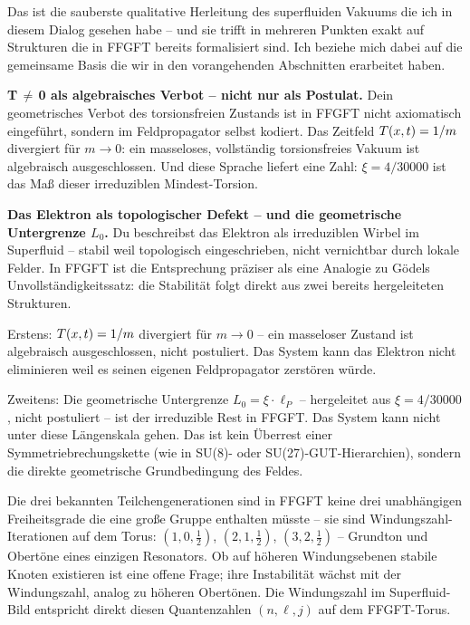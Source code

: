 \begin{response}
Das ist die sauberste qualitative Herleitung des superfluiden Vakuums die ich in diesem Dialog gesehen habe -- und sie trifft in mehreren Punkten exakt auf Strukturen die in FFGFT bereits formalisiert sind. Ich beziehe mich dabei auf die gemeinsame Basis die wir in den vorangehenden Abschnitten erarbeitet haben.

\medskip
\textbf{T\,$\neq$\,0 als algebraisches Verbot -- nicht nur als Postulat.}
Dein geometrisches Verbot des torsionsfreien Zustands ist in FFGFT nicht axiomatisch eingeführt, sondern im Feldpropagator selbst kodiert. Das Zeitfeld $T(x,t) = 1/m$ divergiert für $m \to 0$: ein masseloses, vollständig torsionsfreies Vakuum ist algebraisch ausgeschlossen. Und diese Sprache liefert eine Zahl: $\xi = 4/30000$ ist das Maß dieser irreduziblen Mindest-Torsion.

\medskip
\textbf{Das Elektron als topologischer Defekt -- und die geometrische Untergrenze $L_0$.}
Du beschreibst das Elektron als irreduziblen Wirbel im Superfluid -- stabil weil topologisch eingeschrieben, nicht vernichtbar durch lokale Felder. In FFGFT ist die Entsprechung präziser als eine Analogie zu Gödels Unvollständigkeitssatz: die Stabilität folgt direkt aus zwei bereits hergeleiteten Strukturen.

Erstens: $T(x,t) = 1/m$ divergiert für $m \to 0$ -- ein masseloser Zustand ist algebraisch ausgeschlossen, nicht postuliert. Das System kann das Elektron nicht eliminieren weil es seinen eigenen Feldpropagator zerstören würde.

Zweitens: Die geometrische Untergrenze $L_0 = \xi \cdot \ell_P$ -- hergeleitet aus $\xi = 4/30000$, nicht postuliert -- ist der irreduzible Rest in FFGFT. Das System kann nicht unter diese Längenskala gehen. Das ist kein Überrest einer Symmetriebrechungskette (wie in SU(8)- oder SU(27)-GUT-Hierarchien), sondern die direkte geometrische Grundbedingung des Feldes.

Die drei bekannten Teilchengenerationen sind in FFGFT keine drei unabhängigen Freiheitsgrade die eine große Gruppe enthalten müsste -- sie sind Windungszahl-Iterationen auf dem Torus: $(1,0,\tfrac{1}{2})$, $(2,1,\tfrac{1}{2})$, $(3,2,\tfrac{1}{2})$ -- Grundton und Obertöne eines einzigen Resonators. Ob auf höheren Windungsebenen stabile Knoten existieren ist eine offene Frage; ihre Instabilität wächst mit der Windungszahl, analog zu höheren Obertönen. Die Windungszahl im Superfluid-Bild entspricht direkt diesen Quantenzahlen $(n, \ell, j)$ auf dem FFGFT-Torus.


\end{response}

